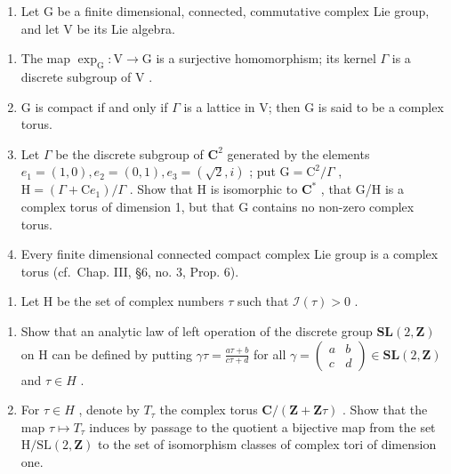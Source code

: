 
\begin{enumerate}
\def\labelenumi{\arabic{enumi})}
\tightlist
\item
  Let \(\mathrm{G}\) be a finite dimensional, connected, commutative complex Lie group, and let \(\mathrm{V}\) be its Lie algebra.
\end{enumerate}

\begin{enumerate}
\def\labelenumi{\alph{enumi})}
\item
  The map \(\exp_{\mathrm{G}}: \mathrm{V} \to \mathrm{G}\) is a surjective homomorphism; its kernel \(\Gamma\) is a discrete subgroup of \(\mathrm{V}\) .
\item
  G is compact if and only if \(\Gamma\) is a lattice in V; then G is said to be a complex torus.
\item
  Let \(\Gamma\) be the discrete subgroup of \(\mathbf{C}^2\) generated by the elements \(e_1 = (1,0), e_2 = (0,1), e_3 = (\sqrt{2},i)\) ; put \(\mathrm{G} = \mathrm{C}^2 / \Gamma\) , \(\mathrm{H} = (\Gamma + \mathrm{C}e_1) / \Gamma\) . Show that H is isomorphic to \(\mathbf{C}^*\) , that G/H is a complex torus of dimension 1, but that G contains no non-zero complex torus.
\item
  Every finite dimensional connected compact complex Lie group is a complex torus (cf.~Chap. III, §6, no. 3, Prop. 6).
\end{enumerate}

\begin{enumerate}
\def\labelenumi{\arabic{enumi})}
\setcounter{enumi}{1}
\tightlist
\item
  Let H be the set of complex numbers \(\tau\) such that \(\mathcal{I}(\tau) > 0\) .
\end{enumerate}

\begin{enumerate}
\def\labelenumi{\alph{enumi})}
\item
  Show that an analytic law of left operation of the discrete group \(\mathbf{SL}(2,\mathbf{Z})\) on H can be defined by putting \(\gamma\tau=\frac{a\tau+b}{c\tau+d}\) for all \(\gamma=\begin{pmatrix}a&b\\ c&d\end{pmatrix}\in\mathbf{SL}(2,\mathbf{Z})\) and \(\tau\in H\) .
\item
  For \(\tau\in H\) , denote by \(T_{\tau}\) the complex torus \(\mathbf{C}/(\mathbf{Z}+\mathbf{Z}\tau)\) . Show that the map \(\tau\mapsto T_{\tau}\) induces by passage to the quotient a bijective map from the set \(\mathrm{H}/\mathrm{SL}(2,\mathbf{Z})\) to the set of isomorphism classes of complex tori of dimension one.
\end{enumerate}


